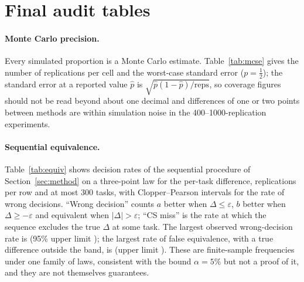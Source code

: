 \section{Final audit tables}\label{app:audit}
\paragraph{Monte Carlo precision.}\label{app:mcse} Every simulated proportion is a Monte Carlo estimate. Table~\ref{tab:mcse} gives the number of replications per cell and the worst-case standard error ($p=\tfrac12$); the standard error at a reported value $\hat p$ is $\sqrt{\hat p(1-\hat p)/\text{reps}}$, so coverage figures should not be read beyond about one decimal and differences of one or two points between methods are within simulation noise in the 400--1000-replication experiments.
\begin{table}[H]
\centering\footnotesize
\caption{Replications per simulation cell and worst-case Monte Carlo standard error.}\label{tab:mcse}

\end{table}

\paragraph{Sequential equivalence.}\label{app:equiv} Table~\ref{tab:equiv} shows decision rates of the sequential procedure of Section~\ref{sec:method} on a three-point law for the per-task difference, \equivReps{} replications per row and at most 300 tasks, with Clopper--Pearson intervals for the rate of wrong decisions. ``Wrong decision'' counts $a$ better when $\Delta\le\varepsilon$, $b$ better when $\Delta\ge-\varepsilon$ and equivalent when $|\Delta|>\varepsilon$; ``CS miss'' is the rate at which the sequence excludes the true $\Delta$ at some task. The largest observed wrong-decision rate is \equivWrongMax{} (95\% upper limit \equivWrongMaxUpper); the largest rate of false equivalence, with a true difference outside the band, is \equivFalseEquivMax{} (upper limit \equivFalseEquivMaxUpper). These are finite-sample frequencies under one family of laws, consistent with the bound $\alpha=5\%$ but not a proof of it, and they are not themselves guarantees.
\begin{table}[!tbp]
\centering\footnotesize
\caption{Sequential decisions by margin and true difference (all in percentage points of score, rates in \%).}\label{tab:equiv}

\end{table}

